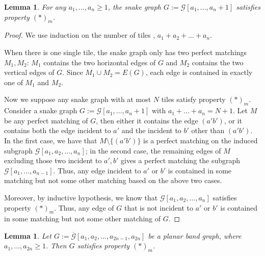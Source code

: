 \documentclass[11pt]{amsart}
\newtheorem{lem}[thm]{Lemma}
\theoremstyle{definition}
\theoremstyle{remark}
\numberwithin{equation}{section}
\begin{document}
\begin{lem}\label{lem: property_star_for_snakes}
    For any $a_1,...,a_{n}\geq 1$, the snake graph $G := \mathcal{G}[a_1,...,a_{n}+1]$ satisfies property $(*)_m$.
\end{lem}
\begin{proof}
    We use induction on the number of tiles , $a_1+a_2+...+a_n$. 
    
    When there is one single tile, the snake graph only has two perfect matchings $M_1, M_2$: $M_1$ contains the two horizontal edges of $G$ and $M_2$ contains the two vertical edges of $G$. Since $M_1\cup M_2 = E(G)$, each edge is contained in exactly one of $M_1$ and $M_2$.

    Now we suppose any snake graph with at most $N$ tiles satisfy property $(*)_m$. Consider a snake graph $G := \mathcal{G}[a_1,...,a_{n}+1]$ with $a_1+...+a_n = N+1$. Let $M$ be any perfect matching of $G$, then either it contains the edge $(a'b')$, or it contains both the edge incident to $a'$ and the incident to $b'$ other than $(a'b')$. In the first case, we have that $M\setminus\{(a'b')\}$ is a perfect matching on the induced subgraph $\mathcal{G}[a_1,a_2,...,a_n]$; in the second case, the remaining edges of $M$ excluding those two incident to $a',b'$ gives a perfect matching the subgraph $\mathcal{G}[a_1,...,a_{n-1}]$. Thus, any edge incident to $a'$ or $b'$ is contained in some matching but not some other matching based on the above two cases.
    
    Moreover, by inductive hypothesis, we know that $\mathcal{G}[a_1,a_2,...,a_n]$ satisfies property $(*)_m$. Thus, any edge of $G$ that is not incident to $a'$ or $b'$ is contained in some matching but not some other matching of $G$. 
\end{proof}

\begin{lem}\label{lem: property_star_for_planar_bands}
    Let $G := \overline{\mathcal{G}}[a_1,a_2,...,a_{2n-1}, a_{2n}]$ be a planar band graph, where $a_1,...,a_{2n}\geq 1$. Then $G$ satisfies property $(*)_m$.
\end{lem}
\end{document}
